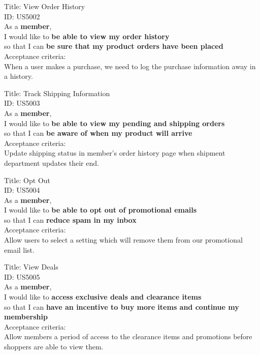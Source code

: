 \documentclass{article}
\begin{document}
\begin{framed}
\noindent
Title:  View Order History \\
ID: US5002 \\
As a \textbf{member},\\
 \textbullet  \quad \quad I would like to \textbf{be able to view my order history }\\ 
 \textbullet  \quad \quad so that I can \textbf{be sure that my product orders have been placed}\\
 Acceptance criteria: \\
  \textbullet  \quad \quad When a user makes a purchase, we need to log the purchase information away in a history.
\end{framed}

\begin{framed}
\noindent
Title:  Track Shipping Information \\
ID: US5003 \\
As a \textbf{member},\\
 \textbullet  \quad \quad I would like to \textbf{be able to view my pending and shipping orders }\\ 
 \textbullet  \quad \quad so that I can \textbf{be aware of when my product will arrive}\\
 Acceptance criteria: \\
  \textbullet  \quad \quad Update shipping status in member's order history page when shipment department updates their end.
\end{framed}

\begin{framed}
\noindent
Title:  Opt Out \\
ID: US5004 \\
As a \textbf{member},\\
\textbullet  \quad \quad I would like to \textbf{be able to opt out of promotional emails}\\ 
\textbullet  \quad \quad so that I can \textbf{reduce spam in my inbox}\\
Acceptance criteria: \\
\textbullet  \quad \quad Allow users to select a setting which will remove them from our promotional email list.
\end{framed}


\begin{framed}
\noindent
Title:  View Deals \\
ID: US5005 \\
As a \textbf{member},\\
\textbullet  \quad \quad I would like to \textbf{access exclusive deals and clearance items}\\ 
\textbullet  \quad \quad so that I can \textbf{have an incentive to buy more items and continue my membership}\\
Acceptance criteria: \\
\textbullet  \quad \quad Allow members a period of access to the clearance items and promotions before shoppers are able to view them.
\end{framed}
\end{document}
